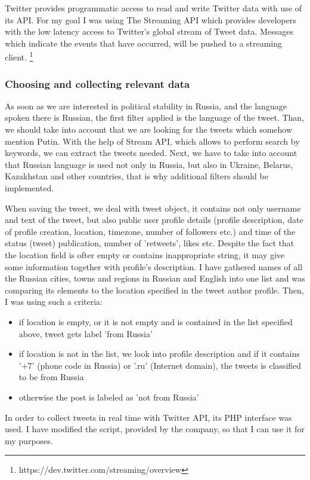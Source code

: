 \documentclass[12pt,a4paper]{article}
\begin{document}
Twitter provides programmatic access to read and write Twitter data with use of its API. For my goal I was using The Streaming API which provides developers with the low latency access to Twitter’s global stream of Tweet data. Messages which indicate the events that have occurred, will be pushed to a streaming client. \footnote{https://dev.twitter.com/streaming/overview}

\subsubsection{Choosing and collecting relevant data}
As soon as we are interested in political stability in Russia, and the language spoken there is Russian, the first filter applied is the language of the tweet. Than, we should take into account that we are looking for the tweets which somehow mention Putin. With the help of Stream API, which allows to perform search by keywords, we can extract the tweets needed.
Next, we have to take into account that Russian language is used not only in Russia, but also in Ukraine, Belarus, Kazakhstan and other countries, that is why additional filters should be implemented.

When saving the tweet, we deal with tweet object, it contains not only username and text of the tweet, but also public user profile details (profile description, date of profile creation, location, timezone, number of followers etc.) and time of the status (tweet) publication, number of 'retweets', likes etc. Despite the fact that the location field is ofter empty or contains inappropriate string, it may give some information together with profile's description.
I have gathered names of all the Russian cities, towns and regions in Russian and English into one list and was comparing its elements to the location specified in the tweet author profile. Then, I was using such a criteria: 
\begin{itemize}
\item if location is empty, or it is not empty and is contained in the list specified above, tweet gets label 'from Russia'
\item if location is not in the list, we look into profile description and if it contains '+7' (phone code in Russia) or '.ru' (Internet domain), the tweets is classified to be from Russia
\item otherwise the post is labeled as 'not from Russia'
\end{itemize}

In order to collect tweets in real time with Twitter API, its PHP interface was used. I have modified the script, provided by the company, so that I can use it for my purposes.
\end{document}
